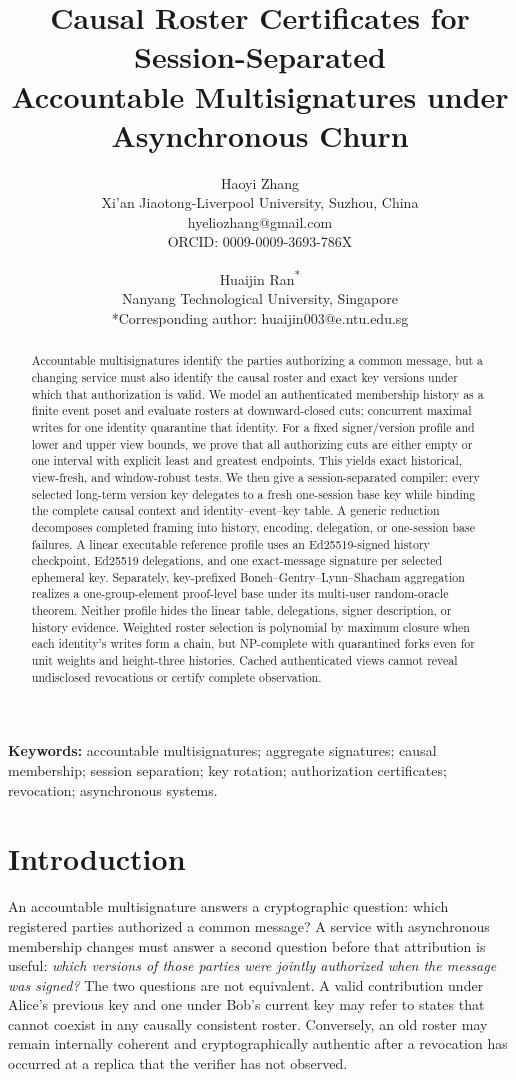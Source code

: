 \documentclass[11pt]{article}
\title{Causal Roster Certificates for Session-Separated\\Accountable Multisignatures under Asynchronous Churn}
\author{Haoyi Zhang\\Xi'an Jiaotong-Liverpool University, Suzhou, China\\\textrm{hyeliozhang@gmail.com}\\ORCID: \textrm{0009-0009-3693-786X}
\and Huaijin Ran\textsuperscript{*}\\Nanyang Technological University, Singapore\\{*}Corresponding author: \textrm{huaijin003@e.ntu.edu.sg}}
\date{}
\theoremstyle{definition}
\begin{document}
\maketitle
\begin{abstract}
Accountable multisignatures identify the parties authorizing a common message, but a changing service must also identify the causal roster and exact key versions under which that authorization is valid. We model an authenticated membership history as a finite event poset and evaluate rosters at downward-closed cuts; concurrent maximal writes for one identity quarantine that identity. For a fixed signer/version profile and lower and upper view bounds, we prove that all authorizing cuts are either empty or one interval with explicit least and greatest endpoints. This yields exact historical, view-fresh, and window-robust tests. We then give a session-separated compiler: every selected long-term version key delegates to a fresh one-session base key while binding the complete causal context and identity--event--key table. A generic reduction decomposes completed framing into history, encoding, delegation, or one-session base failures. A linear executable reference profile uses an Ed25519-signed history checkpoint, Ed25519 delegations, and one exact-message signature per selected ephemeral key. Separately, key-prefixed Boneh--Gentry--Lynn--Shacham aggregation realizes a one-group-element proof-level base under its multi-user random-oracle theorem. Neither profile hides the linear table, delegations, signer description, or history evidence. Weighted roster selection is polynomial by maximum closure when each identity's writes form a chain, but NP-complete with quarantined forks even for unit weights and height-three histories. Cached authenticated views cannot reveal undisclosed revocations or certify complete observation.
\end{abstract}
\noindent\textbf{Keywords:} accountable multisignatures; aggregate signatures; causal membership; session separation; key rotation; authorization certificates; revocation; asynchronous systems.

\section{Introduction}\label{sec:intro}
An accountable multisignature answers a cryptographic question: which registered parties authorized a common message?  A service with asynchronous membership changes must answer a second question before that attribution is useful: \emph{which versions of those parties were jointly authorized when the message was signed?}  The two questions are not equivalent.  A valid contribution under Alice's previous key and one under Bob's current key may refer to states that cannot coexist in any causally consistent roster.  Conversely, an old roster may remain internally coherent and cryptographically authentic after a revocation has occurred at a replica that the verifier has not observed.
\end{document}

